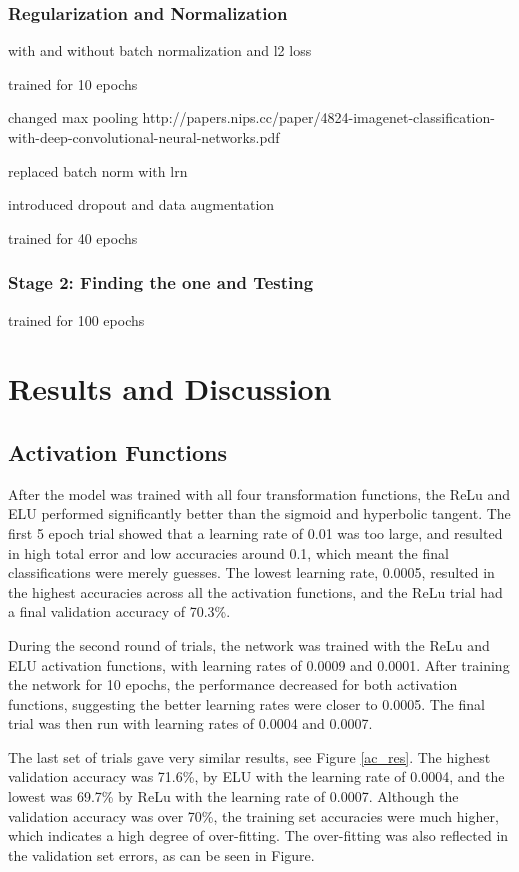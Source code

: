\documentclass[]{article}
\begin{document}
\subsubsection{Regularization and Normalization}


with and without batch normalization and l2 loss

trained for 10 epochs

changed max pooling
http://papers.nips.cc/paper/4824-imagenet-classification-with-deep-convolutional-neural-networks.pdf

replaced batch norm with lrn

introduced dropout and data augmentation

trained for 40 epochs

\subsubsection{Stage 2: Finding the one and Testing}

trained for 100 epochs
 
 
\section{Results and Discussion}

\subsection{Activation Functions}

After the model was trained with all four transformation functions, the ReLu and ELU performed significantly better than the sigmoid and hyperbolic tangent. The first 5 epoch trial showed that a learning rate of 0.01 was too large, and resulted in high total error and low accuracies around 0.1, which meant the final classifications were merely guesses. The lowest learning rate, 0.0005, resulted in the highest accuracies across all the activation functions, and the ReLu trial had a final validation accuracy of 70.3\%. 

During the second round of trials, the network was trained with the ReLu and ELU activation functions, with learning rates of 0.0009 and 0.0001. After training the network for 10 epochs, the performance decreased for both activation functions, suggesting the better learning rates were closer to 0.0005. The final trial was then run with learning rates of 0.0004 and 0.0007. 

The last set of trials gave very similar results, see Figure \ref{ac_res}. The highest validation accuracy was 71.6\%, by ELU with the learning rate of 0.0004, and the lowest was 69.7\% by ReLu with the learning rate of 0.0007. Although the validation accuracy was over 70\%, the training set accuracies were much higher, which indicates a high degree of over-fitting. The over-fitting was also reflected in the validation set errors, as can be seen in Figure. 
\end{document}
